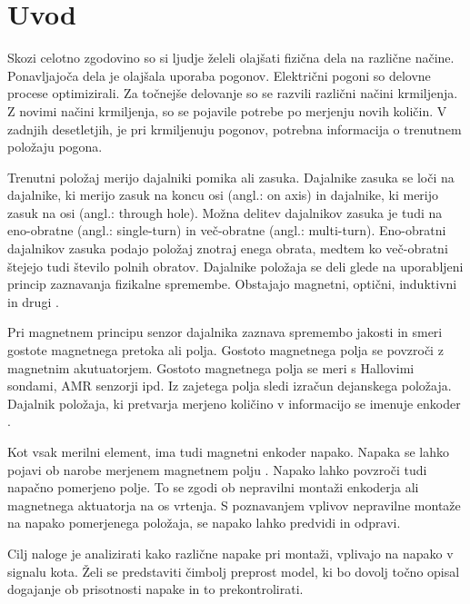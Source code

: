 \chapter{Uvod} \label{uvod}
Skozi celotno zgodovino so si ljudje želeli olajšati fizična dela na različne načine. Ponavljajoča dela je olajšala uporaba pogonov. Električni pogoni so delovne procese optimizirali.
Za točnejše delovanje so se razvili različni načini krmiljenja. Z novimi načini krmiljenja, so se pojavile potrebe po merjenju novih količin. V zadnjih desetletjih, je pri krmiljenuju pogonov, potrebna informacija
o trenutnem položaju pogona.

Trenutni položaj merijo dajalniki pomika ali zasuka\cite{uporabaSenzorjev}. Dajalnike zasuka se loči na dajalnike, ki merijo zasuk na koncu osi (angl.: on axis) in dajalnike, ki merijo zasuk na osi (angl.: through hole).
Možna delitev dajalnikov zasuka je tudi na eno-obratne (angl.: single-turn) in več-obratne (angl.: multi-turn). Eno-obratni dajalnikov zasuka podajo položaj znotraj enega obrata, medtem ko več-obratni
štejejo tudi število polnih obratov. Dajalnike položaja se deli glede na uporabljeni princip zaznavanja fizikalne
spremembe. Obstajajo magnetni, optični, induktivni in drugi \cite{killer}.

Pri magnetnem principu senzor dajalnika zaznava spremembo jakosti in smeri
gostote magnetnega pretoka ali polja. 
Gostoto magnetnega polja se povzroči z magnetnim akutuatorjem. Gostoto magnetnega polja se meri s Hallovimi sondami, AMR senzorji ipd.
Iz zajetega polja sledi izračun dejanskega položaja. Dajalnik položaja, ki pretvarja merjeno količino v informacijo se imenuje enkoder \cite{enkoder}.

Kot vsak merilni element, ima tudi magnetni enkoder napako. Napaka se lahko pojavi ob narobe merjenem magnetnem polju \cite{RLS3}. Napako lahko povzroči tudi napačno pomerjeno polje.
To se zgodi ob nepravilni montaži enkoderja ali magnetnega aktuatorja na os vrtenja. S poznavanjem vplivov nepravilne montaže na napako pomerjenega položaja, se napako lahko predvidi in odpravi.

Cilj naloge je analizirati kako različne napake pri montaži, vplivajo na napako v signalu kota.
Želi se predstaviti čimbolj preprost model, ki bo dovolj točno opisal dogajanje ob prisotnosti napake in to prekontrolirati.

